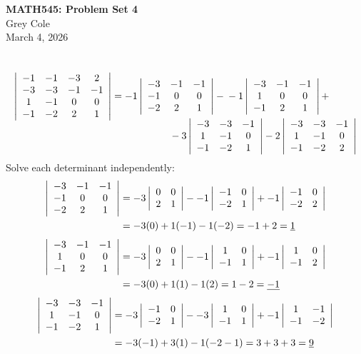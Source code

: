 \documentclass[]{article}
\newcommand{\detmat}[1]{
	\left|\hspace{0.5em}
	\begin{matrix}
		#1
	\end{matrix}
	\hspace{0.5em}\right|
}
\begin{document}
	\begin{center}
		{\Large\textbf{MATH545: Problem Set 4}}\\
		\large Grey Cole\\
		March 4, 2026
	\end{center}
	\section{}
	\begin{align*}
		\detmat{-1&-1&-3&2\\-3&-3&-1&-1\\1&-1&0&0\\-1&-2&2&1} = -1 \detmat{-3&-1&-1\\-1&0&0\\-2&2&1} - 
		\begin{aligned}[t] &-1 \detmat{-3&-1&-1\\1&0&0\\-1&2&1} + \\
		&\hspace{-2cm}-3 \detmat{-3&-3&-1\\1&-1&0\\-1&-2&1} - 2 \detmat{-3&-3&-1\\1&-1&0\\-1&-2&2}
		\end{aligned}
	\end{align*}
	Solve each determinant independently:
	\begin{align*}
		\detmat{-3&-1&-1\\-1&0&0\\-2&2&1} &= -3\detmat{0&0\\2&1}--1\detmat{-1&0\\-2&1}+-1\detmat{-1&0\\-2&2}\\
		&= -3(0) + 1(-1) - 1(-2) = -1 + 2 = \underline{1}
	\end{align*}
	\begin{align*}
		\detmat{-3&-1&-1\\1&0&0\\-1&2&1} &= -3\detmat{0&0\\2&1} --1\detmat{1&0\\-1&1} + -1\detmat{1&0\\-1&2}\\
		&= -3(0) + 1(1) - 1(2) = 1 - 2 = \underline{-1}
	\end{align*}
	\begin{align*}
		\detmat{-3&-3&-1\\1&-1&0\\-1&-2&1} &= -3\detmat{-1&0\\-2&1} --3 \detmat{1&0\\-1&1} + -1\detmat{1&-1\\-1&-2}\\
		&= -3(-1) + 3(1) - 1(-2 - 1) = 3 + 3 + 3 = \underline{9}
	\end{align*}
\end{document}
